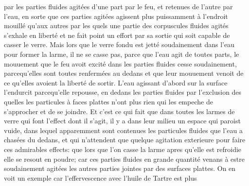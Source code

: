 par les parties fluides agit\'{e}es d'une part par le feu\protect{}, et retenues de l'autre par l'eau\protect{}, en sorte
que ces parties agit\'{e}es agissent plus puissamment \`{a} l'endroit mouillé qu'aux autres par les quels
une partie des corpuscules\protect{}
fluides agit\'{e}s s'exhale en libert\'{e} et ne fait point un effort par sa sortie
qui soit capable de casser le verre.\protect{}
Mais lors que le verre\protect{} fondu est jett\'{e} soudainement dans l'eau\protect{} pour former
la larme\protect{}, il ne se casse pas, parce que l'eau\protect{} agit de toutes parts, le mouuement que le feu\protect{} avoit
excit\'{e} dans les parties fluides cesse soudainement, parcequ'elles sont toutes renferm\'{e}es au dedans et que leur
mouuement venoit de ce qu'elles avoient la libert\'{e} de sortir. L'eau\protect{} agissant d'abord sur la surface l'endurcit
parcequ'elle repousse, en dedans les parties fluides par l'exclusion des quelles les particules\protect{} \`{a} faces plattes n'ont plus
rien qui les empeche de s'approcher et de se joindre. Et c'est ce qui fait que dans toutes les larmes\protect{} de verre\protect{}
qui font l'effect dont il s'agit, il y a dans leur milieu un espace qui paroist vuide,\protect{}
dans lequel apparemment sont contenues les particules\protect{}
fluides que l'eau\protect{} a chas\'{e}es du dedans, et qui n'attendent que quelque agitation
exterieure pour faire ces admirables effects: que lors que l'on casse la larme\protect{} apres qu'elle est refroidie
elle se resout en poudre\protect{}; car ces parties fluides en grande quantit\'{e} venans \`{a} estre soudainement agit\'{e}es
les autres parties jointes par des surfaces plattes.
On en voit un exemple car l'effervescence\protect{}
avec l'huile de Tartre\protect{} est plus
